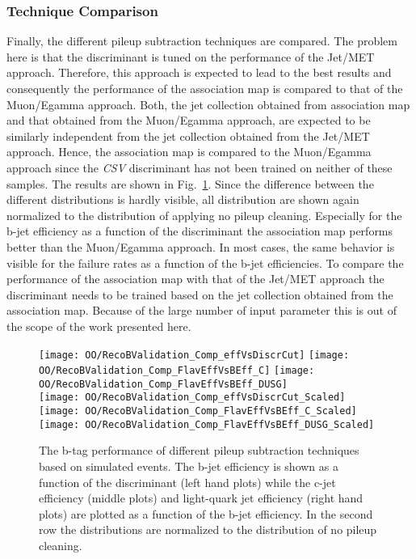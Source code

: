 \subsubsection{Technique Comparison \label{sec:OOBTaggingComp}}

Finally, the different pileup subtraction techniques are compared. The problem here is that the discriminant is tuned on the performance of the Jet/MET approach. Therefore, this approach is expected to lead to the best results and consequently the performance of the association map is compared to that of the Muon/Egamma approach. Both, the jet collection obtained from association map and that obtained from the Muon/Egamma approach, are expected to be similarly independent from the jet collection obtained from the Jet/MET approach. Hence, the association map is compared to the Muon/Egamma approach since the \textit{CSV} discriminant has not been trained on neither of these samples. The results are shown in Fig.~\ref{plot:OOBTaggingComp}. Since the difference between the different distributions is hardly visible, all distribution are shown again normalized to the distribution of applying no pileup cleaning. Especially for the b-jet efficiency as a function of the discriminant the association map performs better than the Muon/Egamma approach. In most cases, the same behavior is visible for the failure rates as a function of the b-jet efficiencies. To compare the performance of the association map with that of the Jet/MET approach the discriminant needs to be trained based on the jet collection obtained from the association map. Because of the large number of input parameter this is out of the scope of the work presented here.

\begin{figure}[Ht]
  \centering
  \texttt{[image: OO/RecoBValidation\_Comp\_effVsDiscrCut]}
  \texttt{[image: OO/RecoBValidation\_Comp\_FlavEffVsBEff\_C]}
  \texttt{[image: OO/RecoBValidation\_Comp\_FlavEffVsBEff\_DUSG]}
  \\
  \texttt{[image: OO/RecoBValidation\_Comp\_effVsDiscrCut\_Scaled]}
  \texttt{[image: OO/RecoBValidation\_Comp\_FlavEffVsBEff\_C\_Scaled]}
  \texttt{[image: OO/RecoBValidation\_Comp\_FlavEffVsBEff\_DUSG\_Scaled]}
  \caption[b-tag performance of different pileup subtraction techniques based on simulated \ttbar events]{The b-tag performance of different pileup subtraction techniques based on simulated \ttbar events. The b-jet efficiency is shown as a function of the discriminant (left hand plots) while the c-jet efficiency (middle plots) and light-quark jet efficiency (right hand plots) are plotted as a function of the b-jet efficiency. In the second row the distributions are normalized to the distribution of no pileup cleaning. \label{plot:OOBTaggingComp}}
\end{figure}


